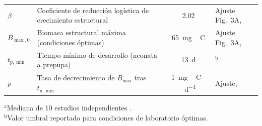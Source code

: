 \begin{table}[htbp]
\begin{tabular}{@{}llcl@{}}
        $\beta$ & Coeficiente de reducción logística de crecimiento estructural & \num{2.02} & Ajuste Fig.~3A, \textcite{eriksenDynamicModellingFeed2022} \\
        $B_{\max,0}$ & Biomasa estructural máxima (condiciones óptimas) & \SI{65}{\milli\gram\,C} & Ajuste Fig.~3A, \textcite{eriksenDynamicModellingFeed2022} \\
        $t_{p,\min}$ & Tiempo mínimo de desarrollo (neonata a prepupa) & \SI{13}{\day} & \textcite{chiaBlackSoldierFly2019}$^{\text{b}}$ \\
        $\rho$ & Tasa de decrecimiento de $B_{\max}$ tras $t_{p,\min}$ & \SI{1}{\milli\gram\,C\,\per\day} & Ajuste, \textcite{eriksenDynamicModellingFeed2022} \\
        \bottomrule
    \end{tabular}
    \begin{flushleft}
        \footnotesize $^{\text{a}}$Mediana de 10 estudios independientes \parencite{eriksenDynamicModellingFeed2022}.\\
        \footnotesize $^{\text{b}}$Valor umbral reportado para condiciones de laboratorio óptimas.
    \end{flushleft}
\end{table}
